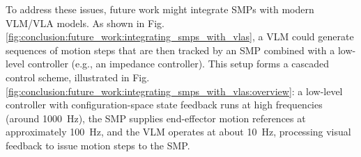 To address these issues, future work might integrate \glspl{SMP} with modern \gls{VLM}/\gls{VLA} models. As shown in Fig.\ref{fig:conclusion:future_work:integrating_smps_with_vlas}, a \gls{VLM} could generate sequences of motion steps that are then tracked by an \gls{SMP} combined with a low-level controller (e.g., an impedance controller). This setup forms a cascaded control scheme, illustrated in Fig.\ref{fig:conclusion:future_work:integrating_smps_with_vlas:overview}: a low-level controller with configuration-space state feedback runs at high frequencies (around \SI{1000}{Hz}), the \gls{SMP} supplies end-effector motion references at approximately \SI{100}{Hz}, and the \gls{VLM} operates at about \SI{10}{Hz}, processing visual feedback to issue motion steps to the \gls{SMP}.

\begin{figure}[ht]
    \centering
    \\

\end{figure}
